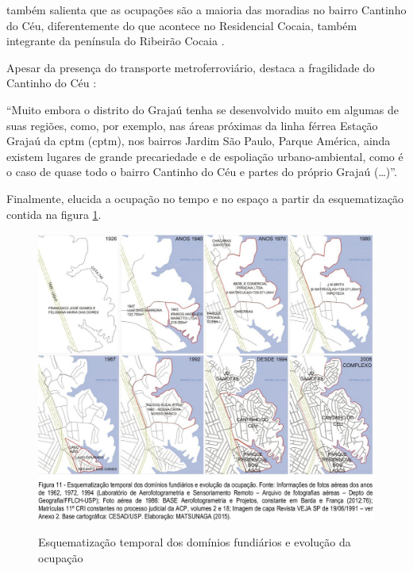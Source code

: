 	 também salienta que as ocupações são a maioria das moradias no bairro Cantinho do Céu, diferentemente do que acontece no Residencial Cocaia, também integrante da península do Ribeirão Cocaia \cite[p.83]{Silva2016}.
	
	Apesar da presença do transporte metroferroviário,  destaca a fragilidade do Cantinho do Céu \cite[p.98]{Silva2016}:
	
	\begin{citacao}
		``Muito embora o distrito do Grajaú tenha se desenvolvido muito em algumas de suas regiões, como, por exemplo, nas áreas próximas da linha férrea Estação Grajaú da \glsdesc{cptm} (\gls{cptm}), nos bairros Jardim São Paulo, Parque América, ainda existem lugares de grande	precariedade e de espoliação urbano-ambiental, como é o caso de quase todo o bairro Cantinho do Céu e partes do próprio Grajaú (\dots)''.
	\end{citacao}
	
	Finalmente,  elucida a ocupação no tempo e no espaço a partir da esquematização contida na figura \ref{fig:esquema_temporal}.

	\begin{figure}[htb]
		\centering
		\caption[Esquematização temporal]{Esquematização temporal dos domínios fundiários e evolução da ocupação}
		\includegraphics[width=\linewidth]{img/matsunaga_esquematizacao}
		\label{fig:esquema_temporal}
	\end{figure}
	
